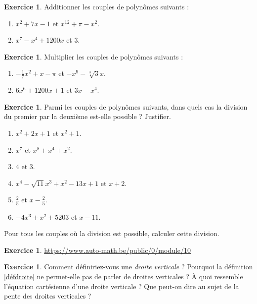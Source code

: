 \documentclass[a4paper,13pt]{scrreprt}
\theoremstyle{plain}
\theoremstyle{definition}
\newtheorem{exo}[subsection]{Exercice}
\begin{document}
\begin{exo} \label{exop2a}
	Additionner les couples de polynômes suivants :
	\begin{enumerate}
		\item $x^2+7x-1$ et $x^{12} + \pi -x^2$.
		\item $x^7 - x^4 +1200x$ et $3$.
	\end{enumerate}
\end{exo}

\begin{exo} \label{exop2b}
	Multiplier les couples de polynômes suivants :
	\begin{enumerate}
		\item $-\frac{1}{7}x^2+x-\pi$ et $-x^{9} -\sqrt[3]{3}x$.
		\item $6x^6 +1200x+1$ et $3x - x^4$.
	\end{enumerate}
\end{exo}

\begin{exo} \label{exop2c}
	Parmi les couples de polynômes suivants, dans quels cas la division du premier par la deuxième est-elle possible ? Justifier.
	\begin{enumerate}
		\item $x^2+2x+1$ et $x^{2} +1$.
		\item $x^7$ et $x^8+x^4+x^2$.
		\item $4$ et $3$.
		\item $x^4 - \sqrt{11} x^3 +x^2 - 13x +1$ et $x+2$.
		\item $\frac{2}{5}$ et $x-\frac{2}{5}$.
		\item $-4x^3 +x^2 +5203$ et $x-11$.
	\end{enumerate}
	Pour tous les couples où la division est possible, calculer cette division.
\end{exo}

\begin{exo} \label{exop3}
	\url{https://www.auto-math.be/public/0/module/10}
\end{exo}

\begin{exo} \label{exop4}
	Comment définiriez-vous une \emph{droite verticale} ? Pourquoi la définition \ref{défdroite} ne permet-elle pas de parler de droites verticales ? À quoi ressemble l'équation cartésienne d'une droite verticale ? Que peut-on dire au sujet de la pente des droites verticales ?
\end{exo}
\end{document}
